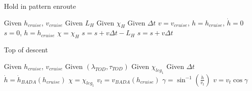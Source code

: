 \documentclass[11pt]{book}              %
\begin{document}
\begin{algorithm}[H]
\caption{Hold in pattern enroute}\label{alg:PropAlgo10.1}
\begin{algorithmic}[1]
\State Given $h_{cruise}$, $v_{cruise}$ 
\State Given $L_{H}$ 
\State Given $\chi_{H}$ 
\State Given $\Delta t$
\State $v = v_{cruise}$, $h = h_{cruise}$, $\dot{h} = 0$
\State $s=0$, $h = h_{cruise}$
\State $\chi = \chi_{H}$
\State $s = s+v\Delta t - L_{H}$
\Else
\State $s = s+v\Delta t$
\EndIf
\EndWhile 
\end{algorithmic}
\end{algorithm}
\begin{algorithm}[H]
\caption{Top of descent}\label{alg:PropAlgo11}
\begin{algorithmic}[1]
\State Given $h_{cruise}$, $v_{cruise}$
\State Given $(\lambda_{TOD},\tau_{TOD})$
\State Given $\chi_{leg_1}$
\State Given $\Delta t$ 
\State $\dot{h} = \dot{h}_{BADA}(h_{cruise})$
\State $\chi = \chi_{leg_1}$
\State $v_t = v_{BADA}(h_{cruise})$
\State $\gamma = \sin^{-1}\left(\frac{\dot{h}}{v_t}\right)$
\State $v = v_t\cos \gamma$
\EndIf
\end{algorithmic}
\end{algorithm}
\end{document}
